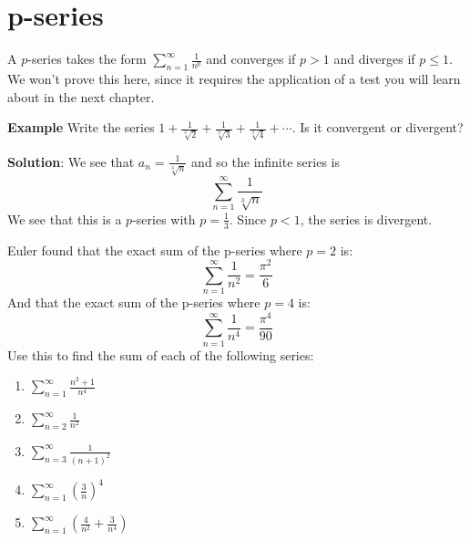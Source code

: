 \section{p-series}
A $p$-series takes the form $\sum_{n=1}^\infty \frac{1}{n^p}$ and converges 
if $p > 1$ and diverges if $p \leq 1$. We won't prove this here, since it 
requires the application of a test you will learn about in the next chapter. 

\textbf{Example} Write the series $1 + \frac{1}{\sqrt[3]{2}} + \frac{1}{
\sqrt[3]{3}} + \frac{1}{\sqrt[3]{4}} + \cdots$. Is it convergent or divergent?

\textbf{Solution}: We see that $a_n = \frac{1}{\sqrt[3]{n}}$ and so the 
infinite series is $$\sum_{n=1}^\infty \frac{1}{\sqrt[3]{n}}$$ 
We see that this is a $p$-series with $p = \frac{1}{3}$. Since $p < 1$, the 
series is divergent. 

\begin{Exercise}[label = euler1]
Euler found that the exact sum of the p-series where $p=2$ is:
$$\sum_{n=1}^\infty \frac{1}{n^2} = \frac{\pi^2}{6}$$
And that the exact sum of the p-series where $p=4$ is:
$$\sum_{n=1}^\infty \frac{1}{n^4} = \frac{\pi^4}{90}$$
Use this to find the sum of each of the following series:
\begin{enumerate}
\item $\sum_{n=1}^\infty \frac{n^2 + 1}{n^4}$
\item $\sum_{n=2}^\infty \frac{1}{n^2}$
\item $\sum_{n=3}^\infty \frac{1}{(n + 1)^2}$
\item $\sum_{n=1}^\infty \left( \frac{3}{n} \right)^4$
\item $\sum_{n=1}^\infty \left( \frac{4}{n^2} + \frac{3}{n^4} \right)$
\end{enumerate}
\vspace{50mm}
\end{Exercise}

